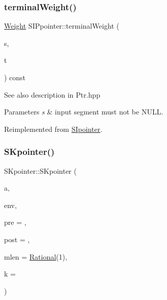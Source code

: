 \mbox{\label{group__table_ga01caac75d66ff2e272a248c7e1954415}} 
\subsubsection{\texorpdfstring{terminalWeight()}{terminalWeight()}\hspace{0.1cm}{\footnotesize\ttfamily [2/2]}}
{\footnotesize\ttfamily \mbox{\hyperlink{classWeight}{Weight}} S\+I\+Ppointer\+::terminal\+Weight (\begin{DoxyParamCaption}\item[{const \mbox{\hyperlink{classInputSegment}{Input\+Segment}} $\ast$}]{s,  }\item[{const \mbox{\hyperlink{classTransition}{Transition}} \&}]{t }\end{DoxyParamCaption}) const\hspace{0.3cm}{\ttfamily [virtual]}}

\begin{DoxySeeAlso}{See also}
description in Ptr.\+hpp 
\end{DoxySeeAlso}

\begin{DoxyParams}{Parameters}
{\em s} & input segment must not be N\+U\+LL. \\
\hline
\end{DoxyParams}


Reimplemented from \mbox{\hyperlink{group__table_ga6b46b59b3b465ba6a995f76ff34970ce}{S\+Ipointer}}.

\mbox{\label{group__table_ga022b6998c4273e2da8128ccd2205a7f6}} 
\subsubsection{\texorpdfstring{SKpointer()}{SKpointer()}\hspace{0.1cm}{\footnotesize\ttfamily [1/4]}}
{\footnotesize\ttfamily S\+Kpointer\+::\+S\+Kpointer (\begin{DoxyParamCaption}\item[{\mbox{\hyperlink{classWTA}{W\+TA}} $\ast$}]{a,  }\item[{\mbox{\hyperlink{classEnvironment}{Environment}} $\ast$}]{env,  }\item[{\mbox{\hyperlink{group__general_ga092fe8b972dfa977c2a0886720a7731e}{pre\+\_\+t}}}]{pre = {},  }\item[{\mbox{\hyperlink{group__general_ga092fe8b972dfa977c2a0886720a7731e}{pre\+\_\+t}}}]{post = {},  }\item[{\mbox{\hyperlink{classRational}{Rational}}}]{mlen = {\ttfamily \mbox{\hyperlink{classRational}{Rational}}(1)},  }\item[{size\+\_\+t}]{k = {} }\end{DoxyParamCaption})}




